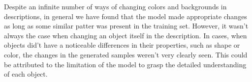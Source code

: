 \documentclass{article} %
\begin{document}
%
%
%

Despite an infinite number of ways of changing colors and backgrounds in descriptions, in general we have found that the model made appropriate changes as long as some similar patter was present in the training set. However, it wasn't always the case when changing an object itself in the description. In cases, when objects did't have a noticeable differences in their properties, such as shape or color, the changes in the generated samples weren't very clearly seen. This could be attributed to the limitation of the model to grasp the detailed understanding of each object. 

\vspace{-0.3cm}
\begin{figure}[h]
\captionsetup[subfigure]{labelformat=empty}
\begin{center}
\quad
%
\quad
%
\quad
%
\quad
%
\end{center}
\label{fig:label}
\vspace{-0.2cm}
\end{figure}
\end{document}
